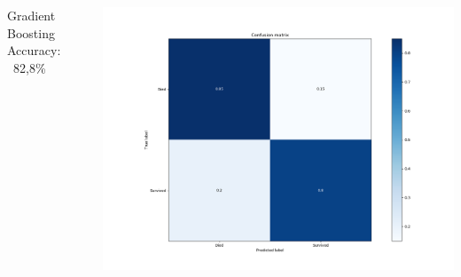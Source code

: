 \begin{frame}[fragile]
\begin{columns}[c]
    Gradient Boosting
    \newline Accuracy: ~82,8\%
	\begin{center}		
		\includegraphics[height=0.3\textheight]{images/confusion_matrix_gradient_boosting.png}
	\end{center}

    
    \end{columns}


\end{frame}